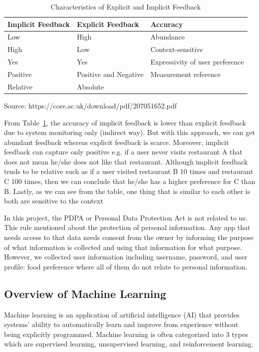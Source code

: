 \documentclass[12pt,oneside,openright,a4paper]{cpe-english-project}
\begin{document}
\begin{table}[!h]
\caption{Characteristics of Explicit and Implicit Feedback}\label{tbl:2CharacteristicsofExplicitandImplicitFeedback}
\begin{tabular}{l|l|l} \hline\hline
Implicit Feedback & Explicit Feedback & Accuracy \\ \hline\hline
Low & High & Abundance \\ \hline
High & Low & Context-sensitive \\ \hline
Yes & Yes & Expressivity of user preference \\ \hline
Positive & Positive and Negative & Measurement reference \\ \hline
Relative & Absolute \\ \hline\hline
\end{tabular}\par
\smallskip
Source: https://core.ac.uk/download/pdf/207051652.pdf
\end{table}


From Table~\ref{tbl:2CharacteristicsofExplicitandImplicitFeedback}, the accuracy of implicit feedback is lower than explicit feedback due to system monitoring only (indirect way). But with this approach, we can get abundant feedback whereas explicit feedback is scarce. Moreover, implicit feedback can capture only positive e.g. if a user never visits restaurant A that does not mean he/she does not like that restaurant. Although implicit feedback tends to be relative such as if a user visited restaurant B 10 times and restaurant C 100 times, then we can conclude that he/she has a higher preference for C than B. Lastly, as we can see from the table, one thing that is similar to each other is both are sensitive to the context


In this project, the PDPA or Personal Data Protection Act is not related to us. This rule mentioned about the protection of personal information. Any app that needs access to that data needs consent from the owner by informing the purpose of what information is collected and using that information for what purpose. However, we collected user information including username, password, and user profile: food preference where all of them do not relate to personal information.

\subsection{Overview of Machine Learning}

Machine learning is an application of artificial intelligence (AI) that provides systems’ ability to automatically learn and improve from experience without being explicitly programmed. \cite{WhatisMachineLearning} Machine learning is often categorized into 3 types which are supervised learning, unsupervised learning, and reinforcement learning.
\end{document}
